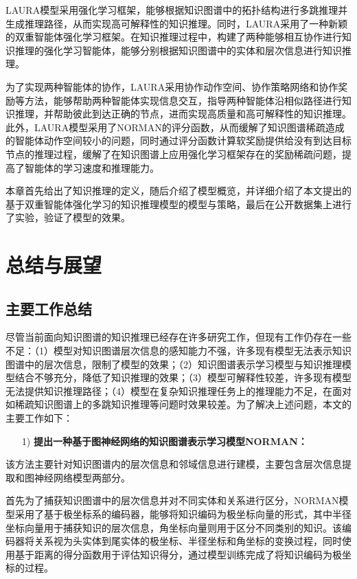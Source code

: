\documentclass[algorithmlist, AutoFakeBold, AutoFakeSlant, figurelist, tablelist, nomlist, engineering, openany]{seuthesix} %
\begin{document}
LAURA模型采用强化学习框架，能够根据知识图谱中的拓扑结构进行多跳推理并生成推理路径，从而实现高可解释性的知识推理。同时，LAURA采用了一种新颖的双重智能体强化学习框架。在知识推理过程中，构建了两种能够相互协作进行知识推理的强化学习智能体，能够分别根据知识图谱中的实体和层次信息进行知识推理。

为了实现两种智能体的协作，LAURA采用协作动作空间、协作策略网络和协作奖励等方法，能够帮助两种智能体实现信息交互，指导两种智能体沿相似路径进行知识推理，并帮助彼此到达正确的节点，进而实现高质量和高可解释性的知识推理。此外，LAURA模型采用了NORMAN的评分函数，从而缓解了知识图谱稀疏造成的智能体动作空间较小的问题，同时通过评分函数计算软奖励提供给没有到达目标节点的推理过程，缓解了在知识图谱上应用强化学习框架存在的奖励稀疏问题，提高了智能体的学习速度和推理能力。

本章首先给出了知识推理的定义，随后介绍了模型概览，并详细介绍了本文提出的基于双重智能体强化学习的知识推理模型的模型与策略，最后在公开数据集上进行了实验，验证了模型的效果。


\chapter{总结与展望}

\section{主要工作总结}
尽管当前面向知识图谱的知识推理已经存在许多研究工作，但现有工作仍存在一些不足：（1）模型对知识图谱层次信息的感知能力不强，许多现有模型无法表示知识图谱中的层次信息，限制了模型的效果；（2）知识图谱表示学习模型与知识推理模型结合不够充分，降低了知识推理的效果；（3）模型可解释性较差，许多现有模型无法提供知识推理路径；（4）模型在复杂知识推理任务上的推理能力不足，在面对如稀疏知识图谱上的多跳知识推理等问题时效果较差。为了解决上述问题，本文的主要工作如下：

\begin{itemize}[leftmargin=*]
  \item [1)]\textbf{提出一种基于图神经网络的知识图谱表示学习模型NORMAN：}
\end{itemize}
  
该方法主要针对知识图谱内的层次信息和邻域信息进行建模，主要包含层次信息提取和图神经网络模型两部分。

首先为了捕获知识图谱中的层次信息并对不同实体和关系进行区分，NORMAN模型采用了基于极坐标系的编码器，能够将知识编码为极坐标向量的形式，其中半径坐标向量用于捕获知识的层次信息，角坐标向量则用于区分不同类别的知识。该编码器将关系视为头实体到尾实体的极坐标、半径坐标和角坐标的变换过程，同时使用基于距离的得分函数用于评估知识得分，通过模型训练完成了将知识编码为极坐标的过程。
\end{document}
